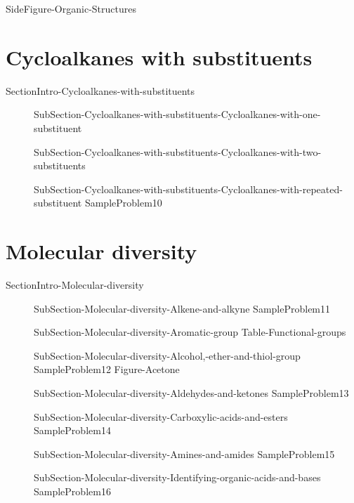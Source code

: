 \documentclass[main.tex]{subfiles}
\newcommand\chapterlabel{Ch-orgo}\setcounter{figurenewcounter}{0}\setcounter{tablenewcounter}{0}\setcounter{formulanewcounter}{0}
\begin{document}
{SideFigure-Organic-Structures}
\section{Cycloalkanes with substituents}{SectionIntro-Cycloalkanes-with-substituents}
\sloppy
\begin{description}
\item[]{SubSection-Cycloalkanes-with-substituents-Cycloalkanes-with-one-substituent}
\item[] {SubSection-Cycloalkanes-with-substituents-Cycloalkanes-with-two-substituents}
\item[]{SubSection-Cycloalkanes-with-substituents-Cycloalkanes-with-repeated-substituent}
{SampleProblem10}
\end{description}




\section{Molecular diversity}{SectionIntro-Molecular-diversity}
\sloppy\begin{description}
\item[]{SubSection-Molecular-diversity-Alkene-and-alkyne}
{SampleProblem11}
 \item[]{SubSection-Molecular-diversity-Aromatic-group}
 {Table-Functional-groups}
\item[]{SubSection-Molecular-diversity-Alcohol,-ether-and-thiol-group}
{SampleProblem12}
\newpage\hspace{0cm}  {Figure-Acetone}
\item[] {SubSection-Molecular-diversity-Aldehydes-and-ketones}
{SampleProblem13}
\item[]{SubSection-Molecular-diversity-Carboxylic-acids-and-esters}
{SampleProblem14}
 \item[] {SubSection-Molecular-diversity-Amines-and-amides}
  {SampleProblem15}
\item[]{SubSection-Molecular-diversity-Identifying-organic-acids-and-bases}
{SampleProblem16}
 \end{description}
 
\end{document}

